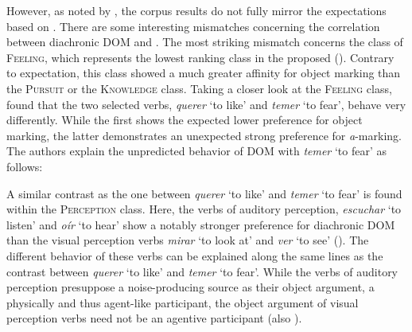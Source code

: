 \documentclass[output=paper]{LSP/langsci}
\begin{document}
However, as noted by \citet{vonHeusingeretal2011Affectedness}, the corpus results do not fully mirror the expectations based on  . There are some interesting mismatches concerning the correlation between diachronic DOM and . The most striking mismatch concerns the class of \textsc{Feeling}, which represents the lowest ranking class in the proposed  (\cf {}). Contrary to expectation, this class showed a much greater affinity for object marking than the \textsc{Pursuit} or the \textsc{Knowledge} class. Taking a closer look at the \textsc{Feeling} class, \citet{vonHeusingeretal2011Affectedness} found that the two selected verbs, \ie \textit{querer} ‘to like’ and \textit{temer} ‘to fear’, behave very differently. While the first shows the expected lower preference for object marking, the latter demonstrates an unexpected strong preference for \textit{a}-marking. The authors explain the unpredicted behavior of DOM with \textit{temer} ‘to fear’ as follows: 


A similar contrast as the one between \textit{querer} ‘to like’ and \textit{temer} ‘to fear’ is found within the \textsc{Perception} class. Here, the verbs of auditory perception, \ie \textit{escuchar} ‘to listen’ and \textit{oír} ‘to hear’ show a notably stronger preference for diachronic DOM than the visual perception verbs \textit{mirar} ‘to look at’ and \textit{ver} ‘to see’ (\cf \citealt[614]{vonHeusingeretal2011Affectedness}). The different behavior of these verbs can be explained along the same lines as the contrast between \textit{querer} ‘to like’ and \textit{temer} ‘to fear’. While the verbs of auditory perception presuppose a noise-producing source as their object argument, \ie a physically  and thus agent-like participant, the object argument of visual perception verbs need not be an agentive participant (\cf also \citealt[244--273]{Enghels2007Modalites}). 
\end{document}
